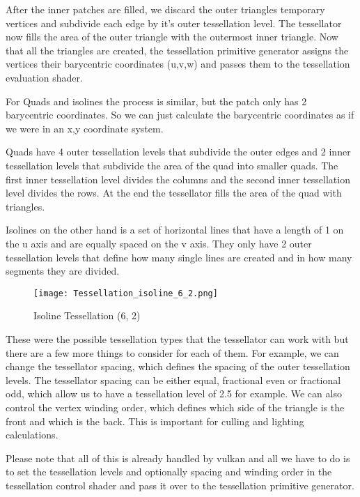 \documentclass[12pt]{report} \usepackage{preamble}
\begin{document}
After the inner patches are filled, we discard the outer triangles temporary vertices
and subdivide each edge by it's outer tessellation level.
The tessellator now fills the area of the outer triangle with the outermost inner triangle.
Now that all the triangles are created, the tessellation primitive generator assigns
the vertices their barycentric coordinates (u,v,w)
and passes them to the tessellation evaluation shader. \cite{tessellation}

For Quads and isolines the process is similar, but the patch only has 2 barycentric coordinates.
So we can just calculate the barycentric coordinates as if we were in
an x,y coordinate system. \cite{tessellation}

Quads have 4 outer tessellation levels that subdivide the outer edges
and 2 inner tessellation levels that subdivide the area of the quad
into smaller quads. The first inner tessellation level divides the columns
and the second inner tessellation level divides the rows.
At the end the tessellator fills the area of the quad with triangles. \cite{tessellation}

Isolines on the other hand is a set of horizontal lines that have a length
of 1 on the u axis and are equally spaced on the v axis.
They only have 2 outer tessellation levels that define how many single lines
are created and in how many segments they are divided.

\begin{figure}[hbtp]
	\centering \texttt{[image: Tessellation\_isoline\_6\_2.png]}
	\caption{Isoline Tessellation (6, 2)}
	\cite{fig:isoline}
\end{figure} \FloatBarrier

These were the possible tessellation types that the tessellator
can work with but there are a few more things to consider for each of them.
For example, we can change the tessellator spacing,
which defines the spacing of the outer tessellation levels.
The tessellator spacing can be either equal, fractional even or fractional odd,
which allow us to have a tessellation level of 2.5 for example. \cite{tessellation}
We can also control the vertex winding order, which defines which side of the triangle
is the front and which is the back. This is important
for culling and lighting calculations. \cite{tessellation}

Please note that all of this is already handled by vulkan
and all we have to do is to set the tessellation levels and optionally spacing
and winding order in the tessellation control shader and pass it over
to the tessellation primitive generator. \cite{tessellation}
\end{document}
